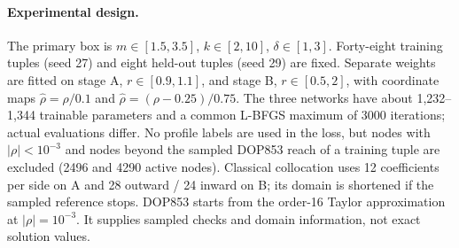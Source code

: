 \documentclass[12pt,a4paper,oneside]{report}
\numberwithin{equation}{chapter}
\theoremstyle{definition}
\theoremstyle{remark}\newtheorem{remark}[theorem]{Remark}
\newif\ifreviewmarks
\DeclareRobustCommand{\review}[1]{{\ifreviewmarks\color{authorblue}\fi #1}}
\begin{document}
\paragraph{Experimental design.}
\review{The primary box is $m\in[1.5,3.5]$, $k\in[2,10]$, $\delta\in[1,3]$. Forty-eight training tuples (seed 27) and eight held-out tuples (seed 29) are fixed. Separate weights are fitted on stage A, $r\in[0.9,1.1]$, and stage B, $r\in[0.5,2]$, with coordinate maps $\widehat\rho=\rho/0.1$ and $\widehat\rho=(\rho-0.25)/0.75$. The three networks have about 1,232--1,344 trainable parameters and a common L-BFGS maximum of 3000 iterations; actual evaluations differ. No profile labels are used in the loss, but nodes with $|\rho|<10^{-3}$ and nodes beyond the sampled DOP853 reach of a training tuple are excluded (2496 and 4290 active nodes). Classical collocation uses 12 coefficients per side on A and 28 outward / 24 inward on B; its domain is shortened if the sampled reference stops. DOP853 starts from the order-16 Taylor approximation at $|\rho|=10^{-3}$. It supplies sampled checks and domain information, not exact solution values.}
\end{document}
